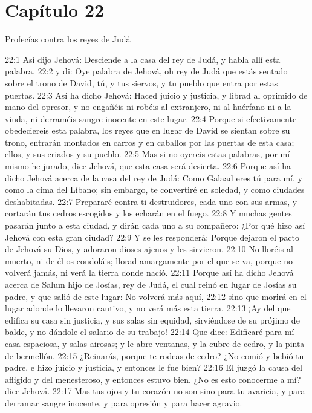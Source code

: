 \section*{Capítulo 22 }
Profecías contra los reyes de Judá 
 
22:1 Así dijo Jehová: Desciende a la casa del rey de Judá, y habla allí esta palabra, 
22:2 y di: Oye palabra de Jehová, oh rey de Judá que estás sentado sobre el trono de David, tú, y tus siervos, y tu pueblo que entra por estas puertas. 
22:3 Así ha dicho Jehová: Haced juicio y justicia, y librad al oprimido de mano del opresor, y no engañéis ni robéis al extranjero, ni al huérfano ni a la viuda, ni derraméis sangre inocente en este lugar. 
22:4 Porque si efectivamente obedeciereis esta palabra, los reyes que en lugar de David se sientan sobre su trono, entrarán montados en carros y en caballos por las puertas de esta casa; ellos, y sus criados y su pueblo. 
22:5 Mas si no oyereis estas palabras, por mí mismo he jurado, dice Jehová, que esta casa será desierta. 
22:6 Porque así ha dicho Jehová acerca de la casa del rey de Judá: Como Galaad eres tú para mí, y como la cima del Líbano; sin embargo, te convertiré en soledad, y como ciudades deshabitadas. 
22:7 Prepararé contra ti destruidores, cada uno con sus armas, y cortarán tus cedros escogidos y los echarán en el fuego. 
22:8 Y muchas gentes pasarán junto a esta ciudad, y dirán cada uno a su compañero: ¿Por qué hizo así Jehová con esta gran ciudad? 
22:9 Y se les responderá: Porque dejaron el pacto de Jehová su Dios, y adoraron dioses ajenos y les sirvieron. 
22:10 No lloréis al muerto, ni de él os condoláis; llorad amargamente por el que se va, porque no volverá jamás, ni verá la tierra donde nació. 
22:11 Porque así ha dicho Jehová acerca de Salum hijo de Josías, rey de Judá, el cual reinó en lugar de Josías su padre, y que salió de este lugar: No volverá más aquí, 
22:12 sino que morirá en el lugar adonde lo llevaron cautivo, y no verá más esta tierra. 
22:13 ¡Ay del que edifica su casa sin justicia, y sus salas sin equidad, sirviéndose de su prójimo de balde, y no dándole el salario de su trabajo! 
22:14 Que dice: Edificaré para mí casa espaciosa, y salas airosas; y le abre ventanas, y la cubre de cedro, y la pinta de bermellón. 
22:15 ¿Reinarás, porque te rodeas de cedro? ¿No comió y bebió tu padre, e hizo juicio y justicia, y entonces le fue bien? 
22:16 El juzgó la causa del afligido y del menesteroso, y entonces estuvo bien. ¿No es esto conocerme a mí? dice Jehová. 
22:17 Mas tus ojos y tu corazón no son sino para tu avaricia, y para derramar sangre inocente, y para opresión y para hacer agravio. 
